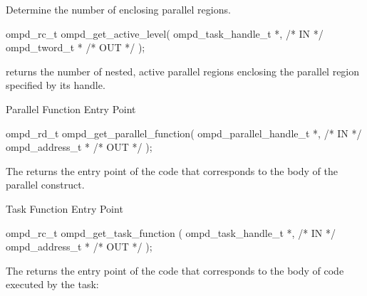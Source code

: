 \descr

\argdesc

\crossreferences


\summary
Determine the number of enclosing  parallel regions.

\format
\ccppspecificstart
\begin{boxedcode}
ompd\_rc\_t ompd\_get\_active\_level(
  ompd\_task\_handle\_t *,                                 /* IN */
  ompd\_tword\_t *                                         /* OUT */
); 
\end{boxedcode}
\ccppspecificend

\descr
{} returns the number of nested, active
parallel regions enclosing the parallel region specified by its handle.

\argdesc

\crossreferences


\summary
Parallel Function Entry Point
\format
\ccppspecificstart
\begin{boxedcode}
ompd\_rd\_t ompd\_get\_parallel\_function(
  ompd\_parallel\_handle\_t *,                         /* IN */
  ompd\_address\_t *                             /* OUT */
);
\end{boxedcode}
\ccppspecificend

\descr
The  returns the
entry point of the code that corresponds to the body of
the parallel construct.
\argdesc

\crossreferences


\summary
Task Function Entry Point
\format
\ccppspecificstart
\begin{boxedcode}
ompd\_rc\_t ompd\_get\_task\_function (
  ompd\_task\_handle\_t *,                                 /* IN */
  ompd\_address\_t *                                 /* OUT */
);
\end{boxedcode}
\ccppspecificend

\descr
The  returns the entry point of the code
that corresponds to the body of code executed by the task:

\argdesc

\crossreferences


\summary

